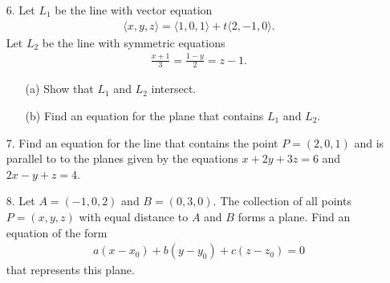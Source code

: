 \documentclass[reqno, 12pt]{amsart}
\begin{document}
\begin{itemize}
          \vspace{2.5 in}
    \item[6.] Let $L_1$ be the line with vector equation
          \begin{align*}
              \langle x,y,z\rangle = \langle 1,0,1\rangle + t\langle 2,-1,0\rangle.
          \end{align*}
          Let $L_2$ be the line with symmetric equations
          \begin{align*}
              \frac{x+1}{3} = \frac{1-y}{2} = z-1.
          \end{align*}
          \begin{enumerate}
              \item[(a)]{Show that $L_1$ and $L_2$ intersect.}

                    \newpage
              \item[(b)]{Find an equation for the plane that contains $L_1$ and $L_2$.}
          \end{enumerate}

          \vspace{4 in}
    \item[7.] Find an equation for the line that contains the point $P = (2,0,1)$ and is parallel to to the planes given by the equations $x+2y+3z = 6$ and $2x-y+z = 4$.

          \newpage
    \item[8.] Let $A = (-1,0,2)$ and $B = (0,3,0)$. The collection of all points $P = (x,y,z)$ with equal distance to $A$ and $B$ forms a plane. Find an equation of the form
          \begin{align*}
              a(x-x_0)+b(y-y_0) + c(z-z_0) = 0
          \end{align*}
          that represents this plane.

\end{itemize}
\end{document}
